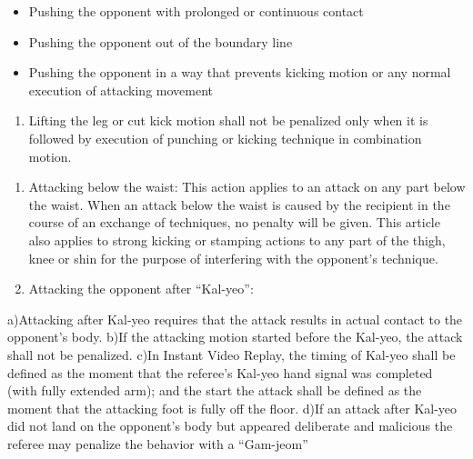 \documentclass[
]{report}
\providecommand{\tightlist}{%
  \setlength{\itemsep}{0pt}\setlength{\parskip}{0pt}}
\renewcommand{\labelenumi}{\arabic{enumi}}
\begin{document}
\begin{itemize}
\tightlist
\item
  Pushing the opponent with prolonged or continuous contact
\item
  Pushing the opponent out of the boundary line
\item
  Pushing the opponent in a way that prevents kicking motion or any
  normal execution of attacking movement
\end{itemize}

\begin{enumerate}
\def\labelenumi{\alph{enumi}.}
\setcounter{enumi}{21}
\tightlist
\item
  Lifting the leg or cut kick motion shall not be penalized only when it
  is followed by execution of punching or kicking technique in
  combination motion.
\end{enumerate}

\begin{enumerate}
\def\labelenumi{\roman{enumi}.}
\setcounter{enumi}{5}
\item
  Attacking below the waist: This action applies to an attack on any
  part below the waist. When an attack below the waist is caused by the
  recipient in the course of an exchange of techniques, no penalty will
  be given. This article also applies to strong kicking or stamping
  actions to any part of the thigh, knee or shin for the purpose of
  interfering with the opponent's technique.
\item
  Attacking the opponent after ``Kal-yeo'':
\end{enumerate}

a)Attacking after Kal-yeo requires that the attack results in actual
contact to the opponent's body. b)If the attacking motion started before
the Kal-yeo, the attack shall not be penalized. c)In Instant Video
Replay, the timing of Kal-yeo shall be defined as the moment that the
referee's Kal-yeo hand signal was completed (with fully extended arm);
and the start the attack shall be defined as the moment that the
attacking foot is fully off the floor. d)If an attack after Kal-yeo did
not land on the opponent's body but appeared deliberate and malicious
the referee may penalize the behavior with a ``Gam-jeom''
\end{document}
